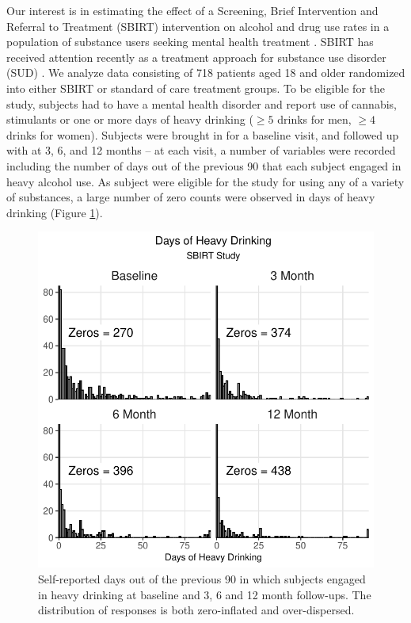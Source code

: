 \documentclass[12pt]{article}
\begin{document}
Our interest is in estimating the effect of a Screening, Brief Intervention and Referral to Treatment (SBIRT) intervention on alcohol and drug use rates in a population of substance users seeking mental health treatment \citep{karno2021effect}. SBIRT has received attention recently as a treatment approach for substance use disorder (SUD) \citep{saitz2014screening, glass2015specialty, barata2017effectiveness, tetrault2020computerized}. We analyze data consisting of 718 patients aged 18 and older randomized into either SBIRT or standard of care treatment groups. To be eligible for the study, subjects had to have a mental health disorder and report use of cannabis, stimulants or one or more days of heavy drinking ($\geq 5$ drinks for men, $\geq 4$ drinks for women). Subjects were brought in for a baseline visit, and followed up with at 3, 6, and 12 months -- at each visit, a number of variables were recorded including the number of days out of the previous 90 that each subject engaged in heavy alcohol use. As subject were eligible for the study for using any of a variety of substances, a large number of zero counts were observed in days of heavy drinking (Figure \ref{fig:inflation}).

\begin{figure}[ht]
	\centering
	\includegraphics[scale=1]{figures/inflation_all_plot.pdf}
	\caption{Self-reported days out of the previous 90 in which subjects engaged in heavy drinking at baseline and 3, 6 and 12 month follow-ups. The distribution of responses is both zero-inflated and over-dispersed.}
	\label{fig:inflation}
\end{figure}
\end{document}
